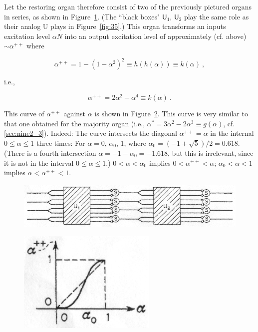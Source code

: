 \documentclass[twocolumn,preprintnumbers,amsmath,amssymb,floatfix]{revtex4}
\begin{document}
Let the restoring organ therefore consist of two of the previously
pictured organs in series, as shown in Figure~\ref{fig:37}. (The
``black boxes" $\textsf{U}_1$, $\textsf{U}_2$ play the same role
as their analog \textsf{U} plays in Figure~\ref{fig:35}.) This
organ transforms an inputs excitation level $\alpha N$ into an
output excitation level of approximately (cf. above) $\sim
\alpha^{++}$ where

\begin{equation*}
\alpha^{++}=1-(1-\alpha^2)^2\equiv h(h(\alpha))\equiv k(\alpha)~,
\end{equation*}

\noindent i.e.,

\begin{equation}
\alpha^{++}=2\alpha^2-\alpha^4\equiv k(\alpha)~. \label{eq:16}
\end{equation}

\noindent This curve of $\alpha^{++}$ against $\alpha$ is shown in
Figure~\ref{fig:38}. This curve is very similar to that one
obtained for the majority organ (i.e.,
$\alpha^*=3\alpha^2-2\alpha^3\equiv g(\alpha)$, cf.
\ref{sec:nine2_3}). Indeed: The curve intersects the diagonal
$\alpha^{++}=\alpha$ in the internal $0\leq \alpha \leq 1$ three
times: For $\alpha=0$, $\alpha_0$, 1, where
$\alpha_0=(-1+\sqrt{5})/2=0.618$. (There is a fourth intersection
$\alpha=-1-\alpha_0=-1.618$, but this is irrelevant, since it is
not in the interval $0\leq\alpha\leq1$.) $0<\alpha<\alpha_0$
implies $0<\alpha^{++}<\alpha$; $\alpha_0<\alpha<1$ implies
$\alpha<\alpha^{++}<1$.

\begin{figure}
\includegraphics[width=5.4in]{fig_37}
\caption{\label{fig:37}}
\end{figure}

\begin{figure}[b]
\includegraphics[width=2.6in]{fig_38}
\caption{\label{fig:38}}
\end{figure}
\end{document}
